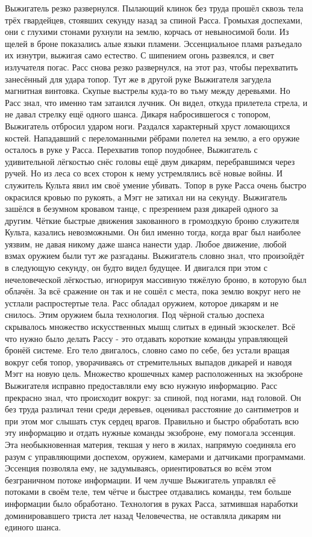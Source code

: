 \documentclass[a4paper, 12pt]{report}
\begin{document}
Выжигатель резко развернулся. Пылающий клинок без труда прошёл сквозь тела трёх гвардейцев, стоявших секунду назад за спиной Расса. Громыхая доспехами, они с глухими стонами рухнули на землю, корчась от невыносимой боли. Из щелей в броне показались алые языки пламени. Эссенциальное пламя разъедало их изнутри, выжигая само естество.
 С шипением огонь развеялся, и свет излучателя погас. Расс снова резко развернулся, на этот раз, чтобы перехватить занесённый для удара топор. Тут же в другой руке Выжигателя загудела магнитная винтовка. Скупые выстрелы куда-то во тьму между деревьями. Но Расс знал, что именно там затаился лучник. Он видел, откуда прилетела стрела, и не давал стрелку ещё одного шанса.
Дикаря набросившегося с топором, Выжигатель отбросил ударом ноги. Раздался характерный хруст ломающихся костей. Нападавший с переломанными рёбрами полетел на землю, а его оружие осталось в руке у Расса. Перехватив топор поудобнее, Выжигатель с удивительной лёгкостью снёс головы ещё двум дикарям, перебравшимся через ручей. Но из леса со всех сторон к нему устремлялись всё новые войны. И служитель Культа явил им своё умение убивать.
 Топор в руке Расса очень быстро окрасился кровью по рукоять, а Мэгг не затихал ни на секунду. Выжигатель зашёлся в безумном кровавом танце, с презрением разя дикарей одного за другим. Чёткие быстрые движения закованного в громоздкую броню служителя Культа, казались невозможными. Он бил именно тогда, когда враг был наиболее уязвим, не давая никому даже шанса нанести удар. Любое движение, любой взмах оружием были тут же разгаданы. Выжигатель словно знал, что произойдёт в следующую секунду, он будто видел будущее. И двигался при этом с нечеловеческой лёгкостью, игнорируя массивную тяжёлую броню, в которую был облачён. За всё сражение он так и не сошёл с места, пока землю вокруг него не устлали распростертые тела.
Расс обладал оружием, которое дикарям и не снилось. Этим оружием была технология.
Под чёрной сталью доспеха скрывалось множество искусственных мышц слитых в единый экзоскелет. Всё что нужно было делать Рассу - это отдавать короткие команды управляющей бронёй системе. Его тело двигалось, словно само по себе, без устали вращая вокруг себя топор, уворачиваясь от стремительных выпадов дикарей и наводя Мэгг на новую цель. Множество крошечных камер расположенных на экзоброне Выжигателя исправно предоставляли ему всю нужную информацию. Расс прекрасно знал, что происходит вокруг: за спиной, под ногами, над головой. Он без труда различал тени среди деревьев, оценивал расстояние до сантиметров и при этом мог слышать стук сердец врагов. 
Правильно и быстро обработать всю эту информацию и отдать нужные команды экзоброне, ему помогала эссенция. Эта необыкновенная материя, текшая у него в жилах, напрямую соединяла его разум с управляющими доспехом, оружием, камерами и датчиками программами. Эссенция позволяла ему, не задумываясь, ориентироваться во всём этом безграничном потоке информации. И чем лучше Выжигатель управлял её потоками в своём теле, тем чётче и быстрее отдавались команды, тем больше информации было обработано. Технология в руках Расса, затмившая наработки доминировавшего триста лет назад Человечества, не оставляла дикарям ни единого шанса. 
\end{document}
